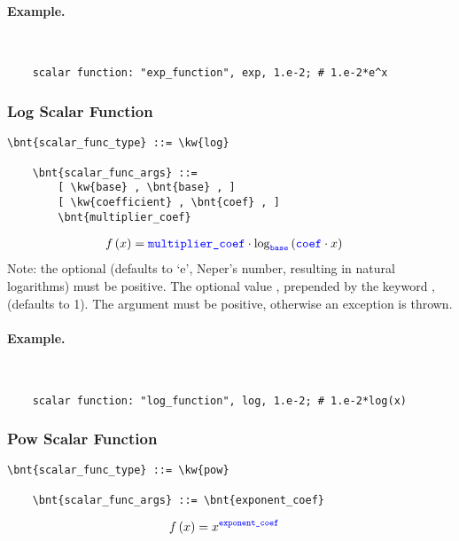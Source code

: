 \paragraph{Example.} \
\begin{verbatim}
    scalar function: "exp_function", exp, 1.e-2; # 1.e-2*e^x
\end{verbatim}

\subsubsection{Log Scalar Function}
\begin{Verbatim}[commandchars=\\\{\}]
    \bnt{scalar_func_type} ::= \kw{log}

    \bnt{scalar_func_args} ::=
        [ \kw{base} , \bnt{base} , ]
        [ \kw{coefficient} , \bnt{coef} , ]
        \bnt{multiplier_coef}
\end{Verbatim}
\begin{align}
	f\left( x \right)
	&=
	\textcolor{blue}{\texttt{multiplier\_coef}} \cdot \log_{\textcolor{blue}{\texttt{base}}}\left( \textcolor{blue}{\texttt{coef}} \cdot x \right)
\end{align}
Note: the optional  (defaults to `$\textrm{e}$', Neper's number,
resulting in natural logarithms)
must be positive.
The optional value , prepended by the keyword ,
(defaults to 1).
The argument must be positive, otherwise an exception is thrown.

\paragraph{Example.} \
\begin{verbatim}
    scalar function: "log_function", log, 1.e-2; # 1.e-2*log(x)
\end{verbatim}

\subsubsection{Pow Scalar Function}
\begin{Verbatim}[commandchars=\\\{\}]
    \bnt{scalar_func_type} ::= \kw{pow}

    \bnt{scalar_func_args} ::= \bnt{exponent_coef}
\end{Verbatim}
\begin{align}
	f\left( x \right)
	&=
	x^{\textcolor{blue}{\texttt{exponent\_coef}}}
\end{align}


